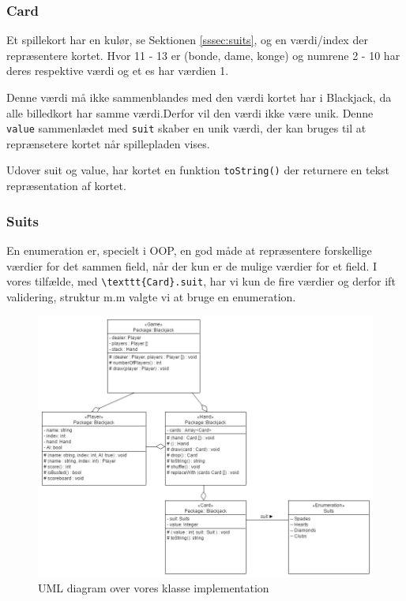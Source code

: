 \documentclass[a4paper]{article}
\begin{document}
      \subsubsection*{Card}
      Et spillekort har en kulør, se Sektionen \ref{sssec:suits}, og en værdi/index der repræsentere kortet.
      Hvor 11 - 13 er (bonde, dame, konge) og numrene 2 - 10 har deres respektive værdi og et es har værdien 1.

      Denne værdi må ikke sammenblandes med den værdi kortet har i Blackjack,
      da alle billedkort har samme værdi.Derfor vil den værdi ikke være unik.
      Denne \lstinline$value$ sammenlædet med \lstinline$suit$ skaber en unik værdi,
      der kan bruges til at reprænsetere kortet når spillepladen vises.

      Udover suit og value, har kortet en funktion \lstinline$toString()$ der returnere en tekst repræsentation af kortet.

      \subsubsection*{Suits} \label{sssec:suits}
      En enumeration er, specielt i OOP, en god måde at repræsentere forskellige værdier for det sammen field, 
      når der kun er de mulige værdier for et field. I vores tilfælde, med \lstinline$\texttt{Card}.suit$,
      har vi kun de fire værdier og derfor ift validering, struktur m.m valgte vi at bruge en enumeration.

      \begin{figure}[H]
        \centering

        \includegraphics[width=520px]{figures/uml.png}

        \caption{UML diagram over vores klasse implementation}
        \label{fig:umlDiagram}
      \end{figure}
\end{document}
